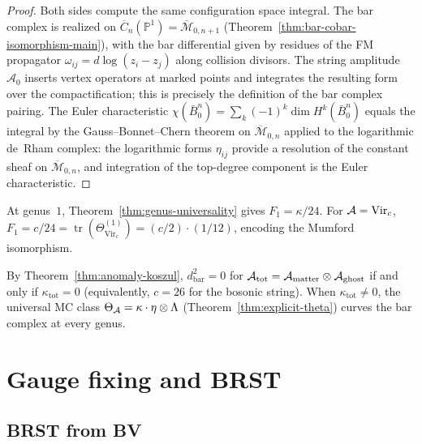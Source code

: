 \begin{proof}
Both sides compute the same configuration space integral.
The bar complex is realized on
$\overline{C}_n(\mathbb{P}^1) = \overline{\mathcal{M}}_{0,n+1}$
(Theorem~\ref{thm:bar-cobar-isomorphism-main}),
with the bar differential given by residues of the FM propagator
$\omega_{ij} = d\log(z_i - z_j)$ along collision divisors.
The string amplitude $\mathcal{A}_0$ inserts vertex operators
at marked points and integrates the resulting form over the
compactification; this is precisely the definition of the bar
complex pairing.  The Euler characteristic
$\chi(\bar{B}^n_0) = \sum_k (-1)^k \dim H^k(\bar{B}^n_0)$
equals the integral by the Gauss--Bonnet--Chern theorem on
$\overline{\mathcal{M}}_{0,n}$ applied to the logarithmic
de~Rham complex: the logarithmic forms $\eta_{ij}$ provide
a resolution of the constant sheaf on
$\overline{\mathcal{M}}_{0,n}$, and integration of the
top-degree component is the Euler characteristic.
\end{proof}

\begin{remark}\label{rem:genus1-bv}
At genus~$1$, Theorem~\ref{thm:genus-universality} gives $F_1 = \kappa/24$.  For $\mathcal{A} = \mathrm{Vir}_c$, $F_1 = c/24 = \operatorname{tr}(\Theta_{\mathrm{Vir}_c}^{(1)}) = (c/2)\cdot(1/12)$, encoding the Mumford isomorphism.
\end{remark}

\begin{remark}[Anomaly = curvature]\label{rem:anomaly-curvature-bv}
By Theorem~\ref{thm:anomaly-koszul}, $d_{\mathrm{bar}}^2 = 0$ for $\mathcal{A}_{\mathrm{tot}} = \mathcal{A}_{\mathrm{matter}} \otimes \mathcal{A}_{\mathrm{ghost}}$ if and only if $\kappa_{\mathrm{tot}} = 0$ (equivalently, $c = 26$ for the bosonic string).  When $\kappa_{\mathrm{tot}} \neq 0$, the universal MC class $\Theta_{\mathcal{A}} = \kappa \cdot \eta \otimes \Lambda$ (Theorem~\ref{thm:explicit-theta}) curves the bar complex at every genus.
\end{remark}

\section{Gauge fixing and BRST}

\subsection{BRST from BV}

